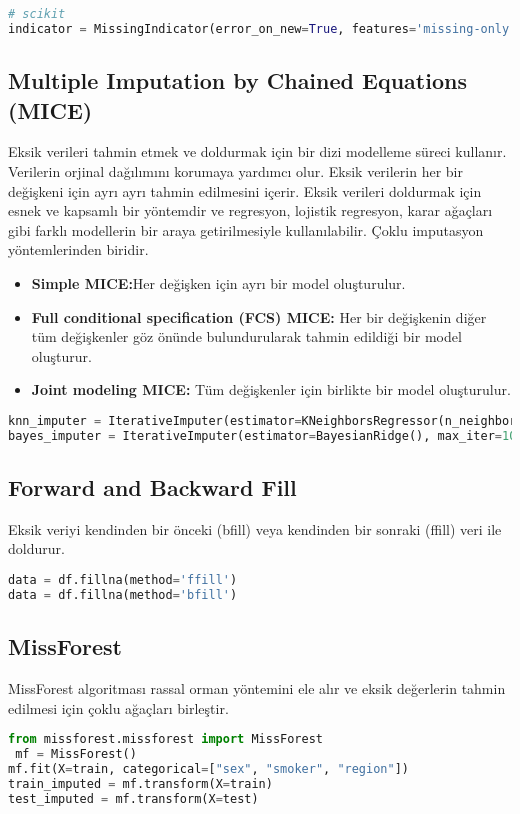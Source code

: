 \begin{lstlisting}[language=Python]
# scikit
indicator = MissingIndicator(error_on_new=True, features='missing-only')
\end{lstlisting}

\subsection{Multiple Imputation by Chained Equations (MICE)}
Eksik verileri tahmin etmek ve doldurmak için bir dizi modelleme süreci kullanır. Verilerin orjinal dağılımını korumaya yardımcı olur. Eksik verilerin her bir değişkeni için ayrı ayrı tahmin edilmesini içerir. Eksik verileri doldurmak için esnek ve kapsamlı bir yöntemdir ve regresyon, lojistik regresyon, karar ağaçları gibi farklı modellerin bir araya getirilmesiyle kullanılabilir. Çoklu imputasyon yöntemlerinden biridir.

\begin{itemize}
    \item \textbf{Simple MICE:}Her değişken için ayrı bir model oluşturulur.
    \item \textbf{Full conditional specification (FCS) MICE:} Her bir değişkenin diğer tüm değişkenler göz önünde bulundurularak tahmin edildiği bir model oluşturur.
    \item \textbf{Joint modeling MICE:} Tüm değişkenler için birlikte bir model oluşturulur.
\end{itemize}

\begin{lstlisting}[language=Python]
knn_imputer = IterativeImputer(estimator=KNeighborsRegressor(n_neighbors=5), max_iter=10, random_state=0)
bayes_imputer = IterativeImputer(estimator=BayesianRidge(), max_iter=10, random_state=0)
\end{lstlisting}

\subsection{Forward and Backward Fill}
Eksik veriyi kendinden bir önceki (bfill) veya kendinden bir sonraki (ffill) veri ile doldurur.

\begin{lstlisting}[language=Python]
data = df.fillna(method='ffill')
data = df.fillna(method='bfill')
\end{lstlisting}

\subsection{MissForest}
MissForest algoritması rassal orman yöntemini ele alır ve eksik değerlerin tahmin edilmesi için çoklu ağaçları birleştir. 

\begin{lstlisting}[language=Python]
 from missforest.missforest import MissForest
 mf = MissForest()
mf.fit(X=train, categorical=["sex", "smoker", "region"])
train_imputed = mf.transform(X=train)
test_imputed = mf.transform(X=test)
\end{lstlisting}

\newpage